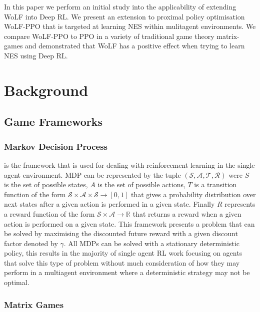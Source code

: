 \documentclass[conference]{IEEEtran}
\begin{document}
In this paper we perform an initial study into the applicability of extending WoLF into Deep RL. We present an extension to proximal policy optimisation WoLF-PPO that is targeted at learning NES within mulitagent environments. We compare WoLF-PPO to PPO in a variety of traditional game theory matrix-games and demonstrated that WoLF has a positive effect when trying to learn NES using Deep RL.

\section{Background}

\subsection{Game Frameworks}

\subsubsection{Markov Decision Process} is the framework that is used for dealing with reinforcement
learning in the single agent environment. MDP can be represented by the tuple 
$(\mathcal{S}, \mathcal{A}, \mathcal{T}, \mathcal{R})$ were $S$ is the set of possible
states, $A$ is the set of possible actions, $T$ is a transition function of the form 
$\mathcal{S}\times\mathcal{A}\times\mathcal{S}\rightarrow [0,1]$ that gives a probability
distribution over next states after a given action is performed in a given state. Finally
$R$ represents a reward function of the form $\mathcal{S}\times\mathcal{A}\rightarrow \mathbb{R}$
that returns a reward when a given action is performed on a given state. This framework presents a problem that can be solved by maximising the discounted
future reward with a given discount factor denoted by $\gamma$. All MDPs can be solved
with a stationary deterministic policy, this results in the majority of single agent
RL work focusing on agents that solve this type of problem without much consideration
of how they may perform in a multiagent environment where a deterministic strategy may
not be optimal.

\subsubsection{Matrix Games}
\end{document}
